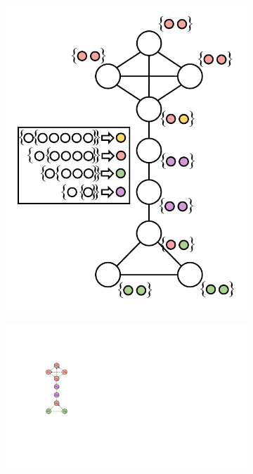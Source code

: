 \begin{figure}[t!]
\centering
\begin{subfigure}{.42\columnwidth}
\includegraphics[clip,width=\textwidth]{figures/dfc1_new_new.pdf}
\subcaption{}
\label{subfig:dfc1}
\end{subfigure}%
\hfill
\begin{subfigure}{.245\columnwidth}
\includegraphics[clip,width=\textwidth]{figures/dfc2_new.pdf}

\end{subfigure}
\end{figure}
